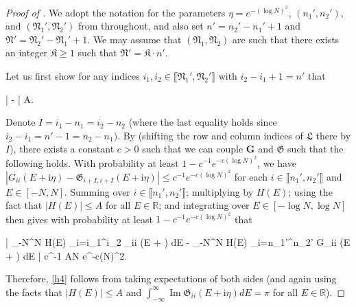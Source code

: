 \documentclass{amsart}
\numberwithin{equation}{section}
\DeclareMathOperator{\Imaginary}{Im}
\theoremstyle{remark}
\theoremstyle{definition}
\begin{document}
	\begin{proof}[Proof of ]
		
		We adopt the notation for the parameters $\eta = e^{-(\log N)^3}$, $(n_1', n_2')$, and $(\mathfrak{N}_1', \mathfrak{N}_2')$ from  throughout, and also set $n' = n_2'-n_1'+1$ and $\mathfrak{N}' = \mathfrak{N}_2' - \mathfrak{N}_1' + 1$. We may assume that $(\mathfrak{N}_1, \mathfrak{N}_2)$ are such that there exists an integer $\mathfrak{K} \ge 1$ such that $\mathfrak{N}' = \mathfrak{K} \cdot n'$. 
		
		Let us first show for any indices $i_1, i_2 \in \llbracket \mathfrak{N}_1', \mathfrak{N}_2' \rrbracket$ with $i_2 - i_1 +1 = n'$ that
		\begin{flalign}
			\label{h4}
			\Bigg|  \bigg[ \displaystyle\int_{-\log N}^{\log N} H(E) \displaystyle\sum_{i=i_1}^{i_2} \Imaginary \mathfrak{G}_{ii} (E + \mathrm{i} \eta) dE \bigg] -  \bigg[ \displaystyle\int_{-\log N}^{\log N} H(E) \displaystyle\sum_{i=n_1'}^{n_2'} \Imaginary G_{ii} (E + \mathrm{i} \eta) dE \bigg] \Bigg| \le A.
		\end{flalign}
		
		\noindent Denote $I = i_1 - n_1 = i_2 - n_2$ (where the last equality holds since $i_2 - i_1 = n' - 1 = n_2 - n_1)$. By  (shifting the row and column indices of $\bm{\mathfrak{L}}$ there by $I$), there exists a constant $c>0$ such that we can couple $\bm{G}$ and $\bm{\mathfrak{G}}$ such that the following holds. With probability at least $1 - c^{-1} e^{-c(\log N)^2}$, we have $| G_{ii} (E + \mathrm{i} \eta) - \mathfrak{G}_{i+I,i+I} (E + \mathrm{i} \eta) | \le c^{-1} e^{-c (\log N)^2}$ for each $i \in \llbracket n_1', n_2' \rrbracket$ and $E \in [-N, N]$. Summing over $i \in \llbracket n_1', n_2' \rrbracket$; multiplying by $H(E)$; using the fact that $| H(E) | \le A$ for all $E \in \mathbb{R}$; and integrating over $E \in [-\log N, \log N]$ then gives with probability at least $1 - c^{-1} e^{-c(\log N)^2}$ that 
		\begin{flalign*}
			\Bigg| \displaystyle\int_{-\log N}^{\log N} H(E) \displaystyle\sum_{i=i_1}^{i_2} _{ii} (E +  \eta) dE - \displaystyle\int_{-\log N}^{\log N} H(E) \displaystyle\sum_{i=n_1'}^{n_2'} G_{ii} (E +  \eta) dE \Bigg| \le c^{-1} AN e^{-c(\log N)^2}.
		\end{flalign*} 
		
		\noindent Therefore, \eqref{h4} follows from taking expectations of both sides (and again using the facts that $| H(E) | \le A$ and $\int_{-\infty}^{\infty} \Imaginary \mathfrak{G}_{ii} (E+\mathrm{i}\eta) dE = \pi$ for all $E \in \mathbb{R}$).
		

\end{proof}
\end{document}
